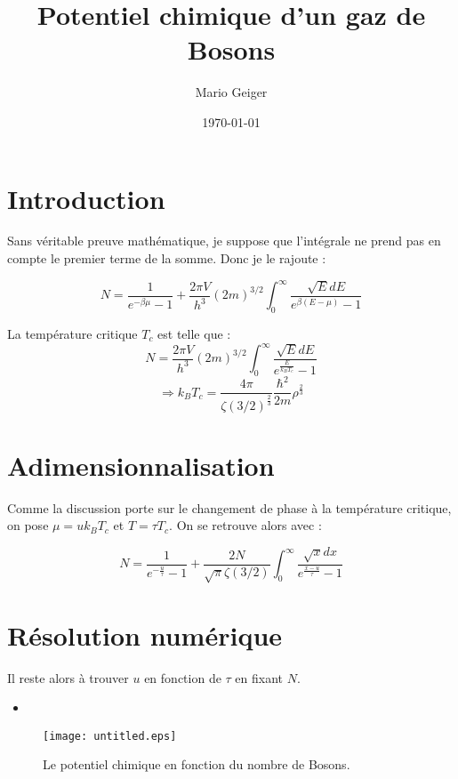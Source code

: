 \documentclass[a4paper,english]{article}
\newcommand{\matlabscript}[2]
  {\begin{itemize}\item[]\end{itemize}}
\begin{document}
\title{Potentiel chimique d'un gaz de Bosons}
\author{Mario Geiger}
\date{\today}
\maketitle

\section{Introduction}

Sans véritable preuve mathématique, je suppose que l'intégrale ne prend pas en compte le premier terme de la somme. Donc je le rajoute :

$$N = \frac{1}{e^{-\beta \mu} - 1} + \frac{2 \pi V}{h^3} (2m)^{3/2} \int_0^\infty \frac{\sqrt{E} dE}{e^{\beta(E-\mu)}-1}$$

La température critique $T_c$ est telle que : 
$$N = \frac{2 \pi V}{h^3} (2m)^{3/2} \int_0^\infty \frac{\sqrt{E} dE}{e^{\frac{E}{k_B T_c}}-1}$$
$$\Rightarrow k_B T_c = \frac{4 \pi}{\zeta(3/2)^\frac{2}{3}} \frac{\hbar^2}{2m} \rho^\frac{2}{3}$$

\section{Adimensionnalisation}

Comme la discussion porte sur le changement de phase à la température critique, on pose $\mu = u k_B T_c$ et $T = \tau T_c$. On se retrouve alors avec :

$$N = \frac{1}{e^{-\frac{u}{\tau}} -1 } + \frac{2N}{\sqrt{\pi} \zeta(3/2)} \int_0^\infty \frac{\sqrt{x} dx}{e^{\frac{x-u}{\tau}}-1}$$

\section{Résolution numérique}
Il reste alors à trouver $u$ en fonction de $\tau$ en fixant $N$.

\matlabscript{bose}{Code matlab}

\begin{figure}
	\centering
	\texttt{[image: untitled.eps]}
	\caption{Le potentiel chimique en fonction du nombre de Bosons.}
\end{figure}
\end{document}
